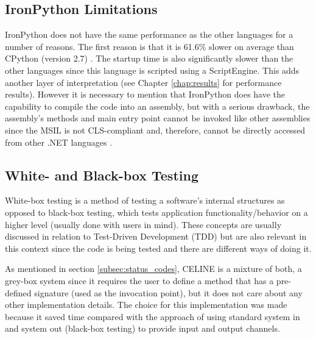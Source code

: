 \subsection{IronPython Limitations} \label{subsec:ironpython_limitations}
IronPython does not have the same performance as the other languages for a number of reasons. The first reason is that it is 61.6\% slower on average than CPython (version 2.7) \cite{IronPythonPerformance}. The startup time is also significantly slower than the other languages since this language is scripted using a ScriptEngine. This adds another layer of interpretation (see Chapter \ref{chap:results} for performance results). However it is necessary to mention that IronPython does have the capability to compile the code into an assembly, but with a serious drawback, the assembly's methods and main entry point cannot be invoked like other assemblies since the MSIL is not CLS-compliant \cite{CLSCompliant} and, therefore, cannot be directly accessed from other .NET languages \cite{AccessingPythonCode}. 


\subsection{White- and Black-box Testing} \label{subsec:whitebox_blackbox}
White-box testing is a method of testing a software's internal structures as opposed to black-box testing, which tests application functionality/behavior on a higher level (usually done with users in mind). These concepts are usually discussed in relation to Test-Driven Development (TDD) but are also relevant in this context since the code is being tested and there are different ways of doing it.  

As mentioned in section \ref{subsec:status_codes}, CELINE is a mixture of both, a grey-box system since it requires the user to define a method that has a pre-defined signature (used as the invocation point), but it does not care about any other implementation details. The choice for this implementation was made because it saved time compared with the approach of using standard system in and system out (black-box testing) to provide input and output channels.


